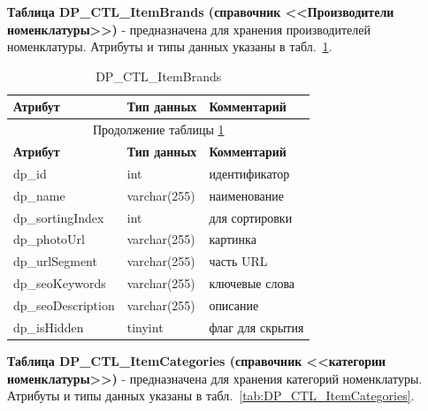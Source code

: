 \textbf{Таблица DP\_CTL\_ItemBrands (справочник <<Производители номенклатуры>>)} - предназначена для хранения производителей номенклатуры.
Атрибуты и типы данных указаны в табл.~\ref{tab:DP_CTL_ItemBrands}.

\begin{longtable}{|p{5.5cm}|p{3.5cm}|p{7.5cm}|}
    \caption{DP\_CTL\_ItemBrands} \label{tab:DP_CTL_ItemBrands} \\
    \hline
    \textbf{Атрибут} & \textbf{Тип данных} & \textbf{Комментарий} \\ \hline
    \endfirsthead

    \multicolumn{3}{c}{Продолжение таблицы \ref{tab:DP_CTL_ItemBrands}} \\
    \hline
    \textbf{Атрибут} & \textbf{Тип данных} & \textbf{Комментарий} \\ \hline
    \endhead

    \endfoot

    \endlastfoot
    dp\_id & int & идентификатор \\ \hline
    dp\_name & varchar(255) & наименование \\ \hline
    dp\_sortingIndex & int & для сортировки \\ \hline
    dp\_photoUrl & varchar(255) & картинка\\ \hline
    dp\_urlSegment & varchar(255) & часть URL \\ \hline
    dp\_seoKeywords & varchar(255) & ключевые слова \\ \hline
    dp\_seoDescription & varchar(255) & описание \\ \hline
    dp\_isHidden & tinyint & флаг для скрытия \\ \hline
\end{longtable}

\textbf{Таблица DP\_CTL\_ItemCategories (справочник <<категории номенклатуры>>)} - предназначена для хранения категорий номенклатуры.
Атрибуты и типы данных указаны в табл.~\ref{tab:DP_CTL_ItemCategories}.

